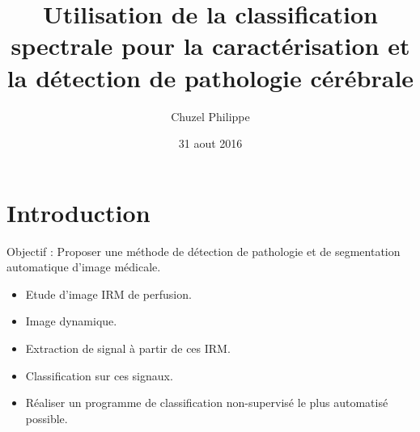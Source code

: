\documentclass{beamer}
\title{Utilisation de la classification spectrale pour la caractérisation et la détection de pathologie cérébrale}
\author{Chuzel Philippe}
\institute{ENSTA Bretagne}
\date{31 aout 2016}
\begin{document}


\begin{frame}
\titlepage
\end{frame}


\section{Introduction}

\begin{frame}

Objectif : Proposer une méthode de détection de pathologie et de segmentation automatique d'image médicale.

\begin{itemize}
\item Etude d'image IRM de perfusion.
\item Image dynamique.
\item Extraction de signal à partir de ces IRM.
\item Classification sur ces signaux.
\item Réaliser un programme de classification non-supervisé le plus automatisé possible.
\end{itemize}

\end{frame}
\end{document}
